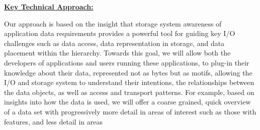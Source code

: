 \documentclass[11pt,letterpaper]{article}
\newcommand{\TODO}[1]{\textcolor{red}{ TO DO: #1 }}
\newcommand{\TODO}[1]{}
\begin{document}
%  
% 


\underline{\textbf{Key Technical Approach:}}

Our  approach is based on the insight that storage system awareness
of application data requirements provides a powerful tool for guiding key
I/O challenges such as data access,  data representation in
storage, and data
placement within the hierarchy.
Towards this goal, we will allow both the developers of applications
and users running these applications, 
 to plug-in their knowledge 
about their data, represented not as bytes but as motifs, allowing the I/O and 
storage system to understand their
intentions, the relationships between the data objects, as well as access
and transport patterns. 
%
%
 For example, based on insights into how the data is used,
we will offer a coarse grained, quick overview of a data set with progressively more detail in 
areas of interest such as those with features, and less detail in areas
\end{document}
